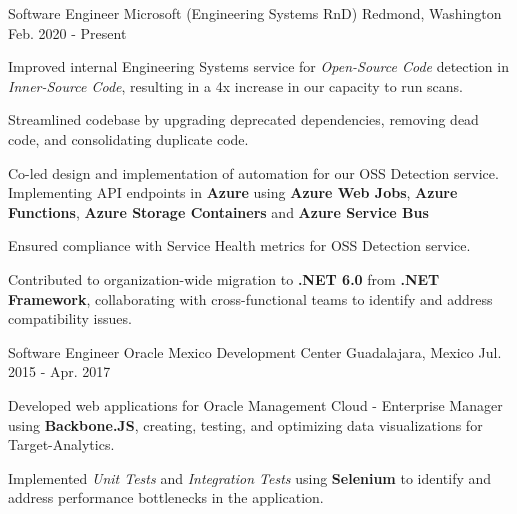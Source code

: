

\begin{cventries}

  \cventry
    {Software Engineer} %
    {Microsoft (Engineering Systems RnD)} %
    {Redmond, Washington} %
    {Feb. 2020 - Present} %
    {
      \begin{cvitems} %
        \item {
          Improved internal Engineering Systems service for \textit{Open-Source Code} detection in \textit{Inner-Source Code},
          resulting in a 4x increase in our capacity to run scans.
          }
        \item {
          Streamlined codebase by upgrading deprecated dependencies, 
          removing dead code, and consolidating duplicate code.
        }
        \item {
          Co-led design and implementation of automation for our OSS Detection service. 
          Implementing API endpoints in \textbf{Azure} using \textbf{Azure Web Jobs}, \textbf{Azure Functions}, \textbf{Azure Storage Containers} and \textbf{Azure Service Bus}
        }
        \item {
          Ensured compliance with Service Health metrics for OSS Detection service.
        }
        \item {
          Contributed to organization-wide migration to \textbf{.NET 6.0} from \textbf{.NET Framework}, 
          collaborating with cross-functional teams to identify and address compatibility issues.
        }  
      \end{cvitems}
    }

  \cventry
    {Software Engineer} %
    {Oracle Mexico Development Center} %
    {Guadalajara, Mexico} %
    {Jul. 2015 - Apr. 2017} %
    {
        \begin{cvitems}
          \item {Developed web applications for Oracle Management Cloud - Enterprise Manager using \textbf{Backbone.JS},
          creating, testing, and optimizing data visualizations for Target-Analytics.}
          \item {Implemented \textit{Unit Tests} and \textit{Integration Tests} using \textbf{Selenium}
          to identify and address performance bottlenecks in the application.}
        \end{cvitems}
    }


\end{cventries}
